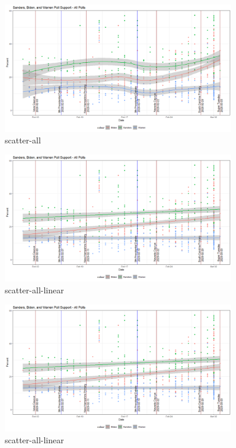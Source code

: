 \begin{figure}[H]
    \centering
    \includegraphics[width=0.9\textwidth]{figures/scatter-all.png}
    \caption{scatter-all}
    \label{scatter-all}
\end{figure}
\begin{figure}[H]
    \centering
    \includegraphics[width=0.9\textwidth]{figures/scatter-all-linear.png}
    \caption{scatter-all-linear}
    \label{scatter-all-linear}
\end{figure}
\begin{figure}[H]
    \centering
    \includegraphics[width=0.9\textwidth]{figures/scatter-all-linear.png}
    \caption{scatter-all-linear}
    \label{scatter-all-linear}
\end{figure}

